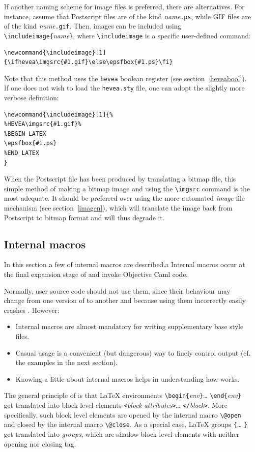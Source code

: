 If another naming scheme for image files is preferred, there are
alternatives.
For instance, assume that Postscript files are of the kind
\textit{name}\texttt{.ps}, while GIF files are of the kind
\textit{name}\texttt{.gif}.
Then, images can be included using
\verb+\includeimage{+\textit{name}\verb+}+, where
\verb+\includeimage+ is a specific user-defined command:
\begin{verbatim}
\newcommand{\includeimage}[1]{\ifhevea\imgsrc{#1.gif}\else\epsfbox{#1.ps}\fi}
\end{verbatim}
Note that this method uses the \texttt{hevea} boolean register (see
section~\ref{heveabool}).
If one does not wish to load the \texttt{hevea.sty} file,
one can adopt the slightly more verbose definition:
\begin{verbatim}
\newcommand{\includeimage}[1]{%
%HEVEA\imgsrc{#1.gif}%
%BEGIN LATEX
\epsfbox{#1.ps}
%END LATEX
}
\end{verbatim}
When the Postscript file has been produced by
translating a bitmap file, this simple method of making a bitmap image and
using the \verb+\imgsrc+ command 
is the most adequate.
It should be preferred over using the more automated \textit{image} file
mechanism (see section~\ref{imagen}),
which will translate the image back from
Postscript to bitmap format and will thus degrade it.

\subsection{Internal \label{internal}macros}
In this section a few of \hevea{} internal macros are
described.a
Internal macros occur at the final expansion stage of \hevea{} and
invoke Objective Caml code.

Normally, user source code should not use them, since
their behaviour may change from one version of \hevea{} to another and
because using them incorrectly easily
crashes \hevea.
However:
\begin{itemize}
\item Internal macros
are almost mandatory for writing supplementary base style files.
\item Casual usage is a convenient (but dangerous) way to finely control
output (cf. the examples in the next section).
\item Knowing a little about internal macros helps in understanding how
\hevea{} works.
\end{itemize}


The general principle of \hevea{} is that \LaTeX{} environments
\verb+\begin{+\textit{env}\verb+}+\ldots{}
\verb+\end{+\textit{env}\verb+}+ get
translated into \html{} block-level elements \verb+<+\textit{block}
\textit{attributes}\verb+>+\ldots{} \verb+</+\textit{block}\verb+>+.
More specifically, such block level elements are opened by the
internal macro \verb+\@open+ and closed by the internal macro
\verb+\@close+.
As a special case, \LaTeX{} groups \verb+{+\ldots{} \verb+}+
get translated into \html{} \emph{groups}, which are shadow block-level
elements with neither opening nor closing tag.

